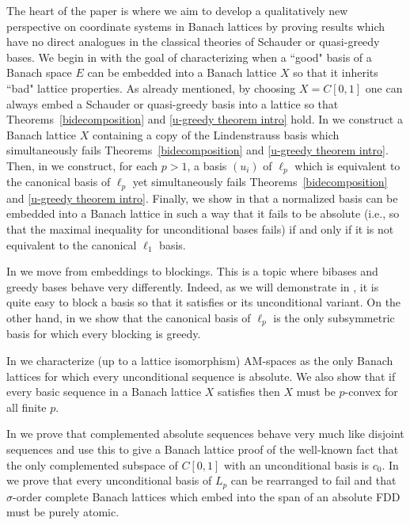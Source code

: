 \documentclass[12pt,leqno]{amsart}
\numberwithin{equation}{section}
\theoremstyle{definition}
\begin{document}
The heart of the paper is  where we aim to develop a qualitatively new perspective on coordinate systems in Banach lattices by proving  results which have no direct analogues in the classical theories of Schauder or quasi-greedy bases. We begin in  with the goal of characterizing when a ``good" basis of a Banach space $E$ can be embedded into a Banach lattice $X$ so that it inherits ``bad" lattice properties. As already mentioned, by choosing $X=C[0,1]$ one can always embed a Schauder or quasi-greedy basis into a lattice so that Theorems~\ref{bidecomposition} and \ref{u-greedy theorem intro} hold. In  we construct a Banach lattice $X$ containing a copy of the Lindenstrauss basis which  simultaneously fails  Theorems~\ref{bidecomposition} and \ref{u-greedy theorem intro}. Then, in  we construct, for each $p>1$, a basis $(u_i)$ of $\ell_p$ which is equivalent to the canonical basis of $\ell_p$ yet simultaneously fails   Theorems~\ref{bidecomposition} and \ref{u-greedy theorem intro}. Finally, we show in  that  a normalized basis  can  be embedded  into a Banach lattice in such a way that it fails to be absolute (i.e., so that the  maximal inequality for unconditional bases fails) if and only if it is not equivalent to the canonical  $\ell_1$ basis.
\medskip


In  we move from embeddings to blockings. This is a topic where  bibases and greedy bases behave very differently. Indeed, as we will demonstrate in ,  it is quite easy to block a basis so that it satisfies  or its unconditional variant. On the other hand, in  we show that the canonical basis of $\ell_p$  is the only subsymmetric basis for which every blocking is greedy. 
\medskip

In  we characterize (up to a lattice isomorphism) AM-spaces as the only Banach lattices for which every unconditional sequence is absolute.  We also show that if every basic sequence in a Banach lattice $X$ satisfies  then $X$ must be  $p$-convex for all finite $p$.
\medskip

In  we prove that complemented absolute sequences behave very much like disjoint sequences and use this to give a Banach lattice proof of the well-known fact that the only complemented  subspace of $C[0,1]$ with an unconditional basis is $c_0$. In  we prove that every unconditional basis of $L_p$ can be rearranged to fail  and that  $\sigma$-order complete Banach lattices which embed into the span of an absolute FDD  must be purely atomic. \medskip
\end{document}
